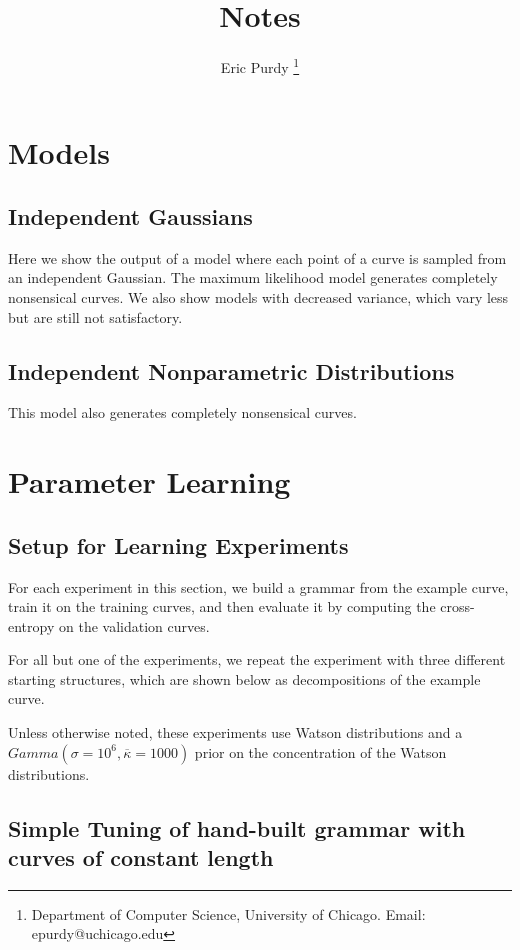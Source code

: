 \documentclass{book}
\title{Notes}
\author{Eric Purdy \footnote{Department of Computer Science, University of Chicago. Email: epurdy@uchicago.edu}}
\begin{document}
\chapter{Models}

\section{Independent Gaussians}
Here we show the output of a model where each point of a curve is
sampled from an independent Gaussian. The maximum likelihood model
generates completely nonsensical curves. We also show models with
decreased variance, which vary less but are still not satisfactory.



\section{Independent Nonparametric Distributions}

This model also generates completely nonsensical curves.



\chapter{Parameter Learning}

\section{Setup for Learning Experiments}

For each experiment in this section, we build a grammar from the
example curve, train it on the training curves, and then evaluate it
by computing the cross-entropy on the validation curves. 

For all but one of the experiments, we repeat the experiment with
three different starting structures, which are shown below as
decompositions of the example curve.

Unless otherwise noted, these experiments use Watson distributions and
a $Gamma(\sigma=10^6, \overline{\kappa}=1000)$ prior on the
concentration of the Watson distributions.



\section{Simple Tuning of hand-built grammar with curves of constant length}
\end{document}
